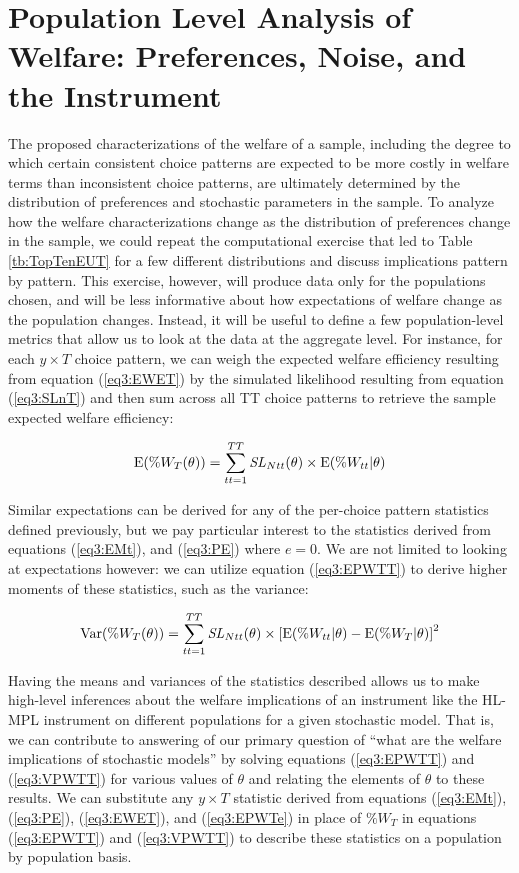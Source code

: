 \documentclass[../main.tex]{subfiles}
\begin{document}
\section{Population Level Analysis of Welfare: Preferences, Noise, and the Instrument}

The proposed characterizations of the welfare of a sample, including the degree to which certain consistent choice patterns are expected to be more costly in welfare terms than inconsistent choice patterns, are ultimately determined by the distribution of preferences and stochastic parameters in the sample.
To analyze how the welfare characterizations change as the distribution of preferences change in the sample, we could repeat the computational exercise that led to Table \ref{tb:TopTenEUT} for a few different distributions and discuss implications pattern by pattern.
This exercise, however, will produce data only for the populations chosen, and will be less informative about how expectations of welfare change as the population changes.
Instead, it will be useful to define a few population-level metrics that allow us to look at the data at the aggregate level.
For instance, for each $y \times T$ choice pattern, we can weigh the expected welfare efficiency resulting from equation (\ref{eq3:EWET}) by the simulated likelihood resulting from equation (\ref{eq3:SLnT}) and then sum across all TT choice patterns to retrieve the sample expected welfare efficiency:

\begin{equation}
	\label{eq3:EPWTT}
	\operatorname{E}(\%W_T(\theta)) = \sum_{tt=1}^{TT} \mathit{SL}_{Ntt}(\theta) \times \operatorname{E}(\%W_{tt} | \theta)
\end{equation}

Similar expectations can be derived for any of the per-choice pattern statistics defined previously, but we pay particular interest to the statistics derived from equations (\ref{eq3:EMt}), and (\ref{eq3:PE}) where $e=0$.
We are not limited to looking at expectations however: we can utilize equation (\ref{eq3:EPWTT}) to derive higher moments of these statistics, such as the variance:

\begin{equation}
	\label{eq3:VPWTT}
	\operatorname{Var}(\%W_T(\theta)) = \sum_{tt=1}^{TT} \mathit{SL}_{Ntt}(\theta) \times \left[ \operatorname{E}(\%W_{tt} | \theta) - \operatorname{E}(\%W_T | \theta) \right]^2
\end{equation}

Having the means and variances of the statistics described allows us to make high-level inferences about the welfare implications of an instrument like the HL-MPL instrument on different populations for a given stochastic model.
That is, we can contribute to answering of our primary question of \enquote{what are the welfare implications of stochastic models} by solving equations (\ref{eq3:EPWTT}) and (\ref{eq3:VPWTT}) for various values of $\theta$ and relating the elements of $\theta$ to these results.
We can substitute any  $y \times T$ statistic derived from equations (\ref{eq3:EMt}), (\ref{eq3:PE}), (\ref{eq3:EWET}), and (\ref{eq3:EPWTe}) in place of $\%W_T$ in equations (\ref{eq3:EPWTT}) and (\ref{eq3:VPWTT}) to describe these statistics on a population by population basis.
\end{document}
